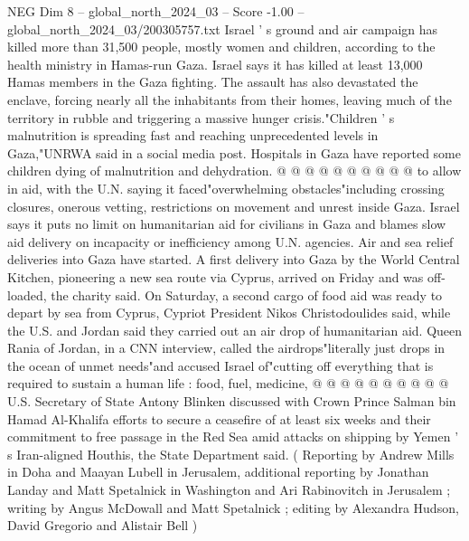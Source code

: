 \begin{textsample}{NEG Dim 8 – global\_north\_2024\_03 – Score -1.00 – global\_north\_2024\_03/200305757.txt}
Israel ' s ground and air campaign has killed more than 31,500 people, mostly women and children, according to the health ministry in Hamas-run Gaza.
Israel says it has killed at least 13,000 Hamas members in the Gaza fighting.
The assault has also devastated the enclave, forcing nearly all the inhabitants from their homes, leaving much of the territory in rubble and triggering a massive hunger crisis."Children ' s malnutrition is spreading fast and reaching unprecedented levels in Gaza,"UNRWA said in a social media post.
Hospitals in Gaza have reported some children dying of malnutrition and dehydration. @ @ @ @ @ @ @ @ @ @ to allow in aid, with the U.N. saying it faced"overwhelming obstacles"including crossing closures, onerous vetting, restrictions on movement and unrest inside Gaza.
Israel says it puts no limit on humanitarian aid for civilians in Gaza and blames slow aid delivery on incapacity or inefficiency among U.N. agencies.
Air and sea relief deliveries into Gaza have started.
A first delivery into Gaza by the World Central Kitchen, pioneering a new sea route via Cyprus, arrived on Friday and was off-loaded, the charity said.
On Saturday, a second cargo of food aid was ready to depart by sea from Cyprus, Cypriot President Nikos Christodoulides said, while the U.S. and Jordan said they carried out an air drop of humanitarian aid.
Queen Rania of Jordan, in a CNN interview, called the airdrops"literally just drops in the ocean of unmet needs"and accused Israel of"cutting off everything that is required to sustain a human life : food, fuel, medicine, @ @ @ @ @ @ @ @ @ @ U.S.
Secretary of State Antony Blinken discussed with Crown Prince Salman bin Hamad Al-Khalifa efforts to secure a ceasefire of at least six weeks and their commitment to free passage in the Red Sea amid attacks on shipping by Yemen ' s Iran-aligned Houthis, the State Department said. ( Reporting by Andrew Mills in Doha and Maayan Lubell in Jerusalem, additional reporting by Jonathan Landay and Matt Spetalnick in Washington and Ari Rabinovitch in Jerusalem ; writing by Angus McDowall and Matt Spetalnick ; editing by Alexandra Hudson, David Gregorio and Alistair Bell )

\end{textsample}
